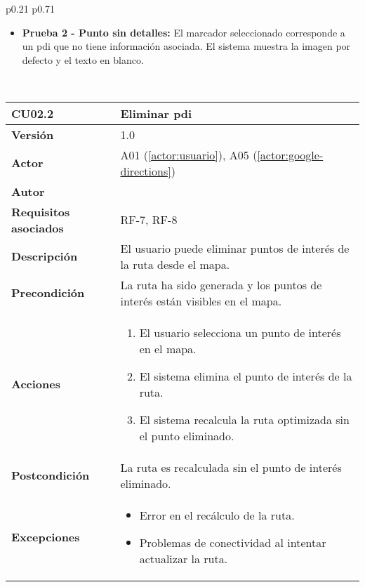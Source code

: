 \begin{table}[H]
\begin{tabularx}{\linewidth}{ p{0.21\columnwidth} p{0.71\columnwidth} }
\begin{itemize}
			\vspace{2pt}
			\item \textbf{Prueba 2 - Punto sin detalles:} El marcador seleccionado corresponde a un \acrshort{pdi} que no tiene información asociada. El sistema muestra la imagen por defecto y el texto en blanco.
		\end{itemize} \\
		\bottomrule
	\end{tabularx}
	\caption{CU02.1 Visualizar detalles de los \acrfull{pdi}}
	\label{cu:visualizar-detalles}
\end{table}


\begin{table}[H]
	\centering
	\begin{tabularx}{\linewidth}{ p{} p{} }
		\toprule
		\textbf{CU02.2}    & \textbf{Eliminar \acrlong{pdi}} \\
		\toprule
		\textbf{Versión}              & 1.0    \\
		\textbf{Actor}                & A01 (\ref{actor:usuario}), A05 (\ref{actor:google-directions}) \\
		\textbf{Autor}                & \autor \\
		\textbf{Requisitos asociados} & RF-7, RF-8 \\
		\textbf{Descripción}          & El usuario puede eliminar puntos de interés de la ruta desde el mapa. \\
		\textbf{Precondición}         & La ruta ha sido generada y los puntos de interés están visibles en el mapa. \\
		\textbf{Acciones}             &
		\begin{enumerate}
			\def\labelenumi{\arabic{enumi}.}
			\tightlist
			\item El usuario selecciona un punto de interés en el mapa.
			\item El sistema elimina el punto de interés de la ruta.
			\item El sistema recalcula la ruta optimizada sin el punto eliminado.
		\end{enumerate}\\
		\textbf{Postcondición}        & La ruta es recalculada sin el punto de interés eliminado. \\
		\textbf{Excepciones}          & 
		\begin{itemize}
			\tightlist
			\item Error en el recálculo de la ruta.
			\item Problemas de conectividad al intentar actualizar la ruta.

\end{itemize}
\end{tabularx}
\end{table}
